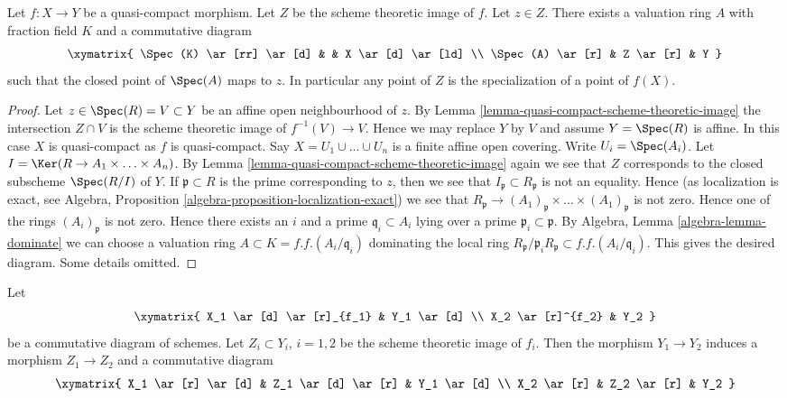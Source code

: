 \begin{lemma}
\label{lemma-reach-points-scheme-theoretic-image}
Let $f : X \to Y$ be a quasi-compact morphism.
Let $Z$ be the scheme theoretic image of $f$.
Let $z \in Z$. There exists a valuation ring $A$ with
fraction field $K$ and a commutative diagram
$$
\xymatrix{
\Spec(K) \ar[rr] \ar[d] & & X \ar[d] \ar[ld] \\
\Spec(A) \ar[r] & Z \ar[r] & Y
}
$$
such that the closed point of $\Spec(A)$ maps to $z$. In particular
any point of $Z$ is the specialization of a point of $f(X)$.
\end{lemma}

\begin{proof}
Let $z \in \Spec(R) = V \subset Y$ be an affine open
neighbourhood of $z$. By
Lemma \ref{lemma-quasi-compact-scheme-theoretic-image}
the intersection $Z \cap V$ is the scheme theoretic image of
$f^{-1}(V) \to V$. Hence we may replace $Y$ by $V$
and assume $Y = \Spec(R)$ is affine.
In this case $X$ is quasi-compact as $f$ is quasi-compact.
Say $X = U_1 \cup \ldots \cup U_n$
is a finite affine open covering. Write $U_i = \Spec(A_i)$.
Let $I = \Ker(R \to A_1 \times \ldots \times A_n)$.
By Lemma \ref{lemma-quasi-compact-scheme-theoretic-image}
again we see that $Z$ corresponds to the closed subscheme
$\Spec(R/I)$ of $Y$. If $\mathfrak p \subset R$ is
the prime corresponding to $z$, then we see that
$I_{\mathfrak p} \subset R_{\mathfrak p}$ is not an
equality. Hence (as localization is exact, see
Algebra, Proposition \ref{algebra-proposition-localization-exact})
we see that
$R_{\mathfrak p} \to
(A_1)_{\mathfrak p} \times \ldots \times (A_1)_{\mathfrak p}$
is not zero. Hence one of the rings $(A_i)_{\mathfrak p}$ is not zero.
Hence there exists an $i$ and a prime $\mathfrak q_i \subset A_i$
lying over a prime $\mathfrak p_i \subset \mathfrak p$.
By Algebra, Lemma \ref{algebra-lemma-dominate} we can choose a valuation ring
$A \subset K = f.f.(A_i/\mathfrak q_i)$ dominating
the local ring
$R_{\mathfrak p}/\mathfrak p_iR_{\mathfrak p} \subset f.f.(A_i/\mathfrak q_i)$.
This gives the desired diagram. Some details omitted.
\end{proof}

\begin{lemma}
\label{lemma-factor-factor}
Let
$$
\xymatrix{
X_1 \ar[d] \ar[r]_{f_1} & Y_1 \ar[d] \\
X_2 \ar[r]^{f_2} & Y_2
}
$$
be a commutative diagram of schemes. Let $Z_i \subset Y_i$, $i = 1, 2$ be
the scheme theoretic image of $f_i$. Then the morphism
$Y_1 \to Y_2$ induces a morphism $Z_1 \to Z_2$ and a
commutative diagram
$$
\xymatrix{
X_1 \ar[r] \ar[d] & Z_1 \ar[d] \ar[r] & Y_1 \ar[d] \\
X_2 \ar[r] & Z_2 \ar[r] & Y_2
}
$$
\end{lemma}

